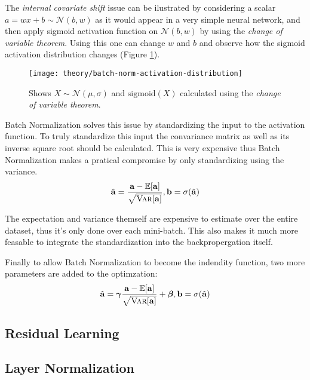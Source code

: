 The \textit{internal covariate shift} issue can be ilustrated by considering a scalar $a = w x + b \sim \mathcal{N}(b, w)$ as it would appear in a very simple neural network, and then apply sigmoid activation function on $\mathcal{N}(b, w)$ by using the \textit{change of variable theorem}. Using this one can change $w$ and $b$ and observe how the sigmoid activation distribution changes (Figure \ref{fig:batch-norm-activation-distribution}).

\begin{figure}[h]
	\centering
	\texttt{[image: theory/batch-norm-activation-distribution]}
	\caption{Shows $X \sim \mathcal{N}(\mu, \sigma)$ and $\mathrm{sigmoid}(X)$ calculated using the \textit{change of variable theorem}.}
	\label{fig:batch-norm-activation-distribution}
\end{figure}

Batch Normalization solves this issue by standardizing the input to the activation function. To truly standardize this input the convariance matrix as well as its inverse square root should be calculated. This is very expensive thus Batch Normalization makes a pratical compromise by only standardizing using the variance.
\begin{equation}
\hat{\mathbf{a}} = \frac{\mathbf{a} - \mathbb{E}[\mathbf{a}]}{\sqrt{\textsc{Var}[\mathbf{a}]}}, \mathbf{b} = \sigma(\hat{\mathbf{a}})
\end{equation}

The expectation and variance themself are expensive to estimate over the entire dataset, thus it's only done over each mini-batch. This also makes it much more feasable to integrate the standardization into the backpropergation itself.

Finally to allow Batch Normalization to become the indendity function, two more parameters are added to the optimzation:
\begin{equation}
\hat{\mathbf{a}} = \bm{\gamma} \frac{\mathbf{a} - \mathbb{E}[\mathbf{a}]}{\sqrt{\textsc{Var}[\mathbf{a}]}} + \bm{\beta}, \mathbf{b} = \sigma(\hat{\mathbf{a}})
\end{equation}

\subsection{Residual Learning}
\cite{residual-learning}

\subsection{Layer Normalization}
\cite{layer-normalization}
